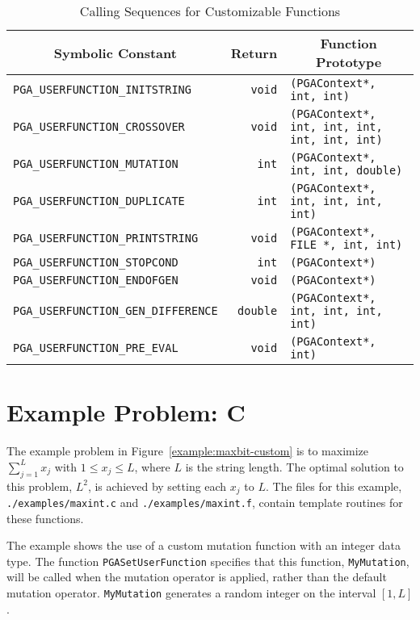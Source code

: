 \documentclass{report}
\begin{document}
\begin{table}
\centering
\caption
{
Calling Sequences for Customizable Functions\label{tab:custom-functions}
}
\begin{tabular}{|l|r|l|} \hline\hline
\multicolumn{1}{|c|}{Symbolic Constant} &
\multicolumn{1}{|c|}{Return} &
\multicolumn{1}{c|}{Function Prototype} \\ \hline
\verb+PGA_USERFUNCTION_INITSTRING+     &\verb+void+   &
    \verb+(PGAContext*, int, int)+ \\
\verb+PGA_USERFUNCTION_CROSSOVER+      &\verb+void+   &
    \verb+(PGAContext*, int, int, int, int, int, int)+ \\
\verb+PGA_USERFUNCTION_MUTATION+       &\verb+int+    &
    \verb+(PGAContext*, int, int, double)+ \\
\verb+PGA_USERFUNCTION_DUPLICATE+      &\verb+int+    &
    \verb+(PGAContext*, int, int, int, int)+ \\
\verb+PGA_USERFUNCTION_PRINTSTRING+    &\verb+void+   &
    \verb+(PGAContext*, FILE *, int, int)+ \\
\verb+PGA_USERFUNCTION_STOPCOND+       &\verb+int+    &
    \verb+(PGAContext*)+ \\
\verb+PGA_USERFUNCTION_ENDOFGEN+       &\verb+void+   &
    \verb+(PGAContext*)+ \\
\verb+PGA_USERFUNCTION_GEN_DIFFERENCE+ &\verb+double+ &
    \verb+(PGAContext*, int, int, int, int)+ \\
\verb+PGA_USERFUNCTION_PRE_EVAL+       &\verb+void+ &
    \verb+(PGAContext*, int)+ \\
\hline
\end{tabular}
\end{table}


\section{Example Problem: C}

The example problem in Figure~\ref{example:maxbit-custom} is to maximize
$\sum_{j=1}^{L} x_{j}$ with $1 \leq x_j \leq L$, where $L$ is the string
length.  The optimal solution to this problem, $L^2$, is achieved by setting
each $x_j$ to $L$.  The files for this example, {\tt ./examples/maxint.c}
and {\tt ./examples/maxint.f}, contain template routines for these functions.

The example shows the use of a custom mutation function with an integer data
type.  The function {\tt PGASetUserFunction} specifies that this function,
{\tt MyMutation}, will be called when the mutation operator is applied, rather
than the default mutation operator.  {\tt MyMutation} generates a random
integer on the interval $[1,L]$.
\end{document}
